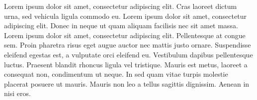 \documentclass[12pt]{hw}
\begin{document}
Lorem ipsum dolor sit amet, consectetur adipiscing elit. Cras laoreet 
dictum urna, sed vehicula ligula commodo eu. Lorem ipsum dolor sit 
amet, consectetur adipiscing elit. Donec in neque ut quam aliquam 
facilisis nec sit amet massa. Lorem ipsum dolor sit amet, consectetur 
adipiscing elit. Pellentesque at congue sem. Proin pharetra risus 
eget augue auctor nec mattis justo ornare. Suspendisse eleifend 
egestas est, a vulputate orci eleifend eu. Vestibulum dapibus 
pellentesque luctus. Praesent blandit rhoncus ligula vel tristique. 
Mauris est metus, laoreet a consequat non, condimentum ut neque. In 
sed quam vitae turpis molestie placerat posuere ut mauris. Mauris non 
leo a tellus sagittis dignissim. Aenean in nisi eros.
\end{document}
